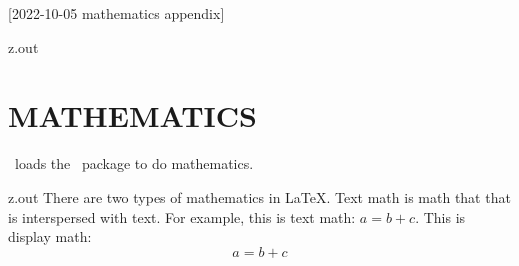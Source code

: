[2022-10-05 mathematics appendix]

\begin{VerbatimOut}{z.out}
\chapter{MATHEMATICS}

\PurdueThesisLogo\ loads the \AMSmathLogo\ package
\cite{amslatex3project2019}
to do mathematics.
\end{VerbatimOut}

\MyIO


\begin{VerbatimOut}{z.out}
There are two types of mathematics in \LaTeX.
Text math is math that that is interspersed with text.
For example, this is text math: \(a = b + c\).
This is display math:
\begin{equation}
  a = b + c
\end{equation}
\end{VerbatimOut}

\MyIO


